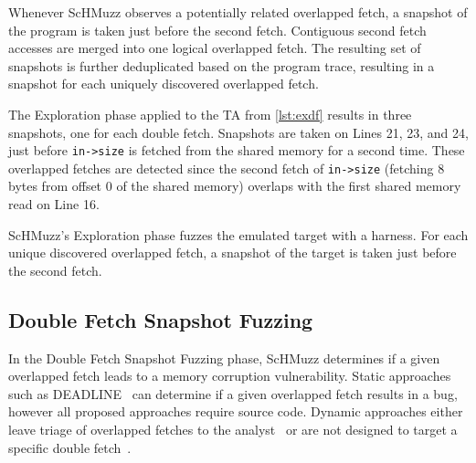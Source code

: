 \documentclass[letterpaper,twocolumn,10pt]{article}
\newcommand{\sysname}{ScHMuzz\xspace}
\newcommand{\stageone}{Exploration\xspace}
\newcommand{\stagetwo}{Double Fetch Snapshot Fuzzing\xspace}
\begin{document}
Whenever \sysname observes a potentially related overlapped fetch, 
a snapshot of the program is taken just before the second fetch. Contiguous second fetch accesses 
are merged into one logical overlapped fetch. 
The resulting set of snapshots is further deduplicated based on the program trace, resulting 
in a snapshot for each uniquely discovered overlapped fetch. 
 
The \stageone phase applied to the TA from \autoref{lst:exdf} results 
in three snapshots, one for each double fetch. Snapshots are taken on Lines 21, 23, and 24, 
just before \texttt{in->size} is fetched from the shared memory for a second time. These overlapped fetches 
are detected since the second fetch of \texttt{in->size} (fetching 8 bytes from offset 0 of 
the shared memory) overlaps with the first shared memory read on Line 16. 

\begin{tcolorbox}
    \sysname's \stageone phase fuzzes the emulated target with a harness. For each unique discovered overlapped fetch, 
    a snapshot of the target is taken just before the second fetch.  
\end{tcolorbox}


\subsection{\stagetwo}
In the \stagetwo phase, \sysname determines if a given overlapped fetch leads to a memory corruption vulnerability. 
Static approaches such as DEADLINE~\cite{deadline} 
can determine if a given overlapped fetch results in a bug, however all proposed 
approaches require source code. Dynamic approaches  
either leave triage of overlapped fetches to the analyst~\cite{bochspwn} or are 
not designed to target a specific double fetch~\cite{decaf,chen2024enclavefuzz,morphuzz}.
\end{document}
